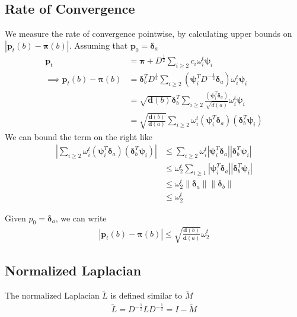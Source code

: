 \documentclass{math}
\renewcommand{\vec}[1]{\boldsymbol{#1}}
\begin{document}
\subsection{Rate of Convergence}

We measure the rate of convergence pointwise, by calculating upper bounds on $|\vec{p}_t(b) - \vec{\pi}(b)|$.
Assuming that $\vec{p}_0 = \vec{\delta}_a$
\begin{align*}
    \vec{p}_t &= \vec{\pi} + D^{\frac{1}{2}} \sum_{i \geq 2} c_i \omega_i^t \vec{\psi}_i \\
    \implies \vec{p}_t(b) - \vec{\pi}(b) &= \vec{\delta}_b^T D^{\frac{1}{2}} \sum_{i \geq 2}\left(\vec{\psi}_i^T D^{-\frac{1}{2}} \vec{\delta}_a\right) \omega_i^t \vec{\psi}_i \\
    &= \sqrt{\vec{d}(b)} \vec{\delta}_b^T \sum_{i \geq 2}\frac{(\vec{\psi}_i^T \vec{\delta}_a)}{\sqrt{d(a)}} \omega_i^t \vec{\psi}_i \\
    &= \sqrt{\frac{\vec{d}(b)}{\vec{d}(a)}} \sum_{i \geq 2}\omega_i^t(\vec{\psi}_i^T \vec{\delta}_a) (\vec{\delta}_b^T \vec{\psi}_i)
\end{align*}
We can bound the term on the right like
\begin{align*}
    \left| \sum_{i \geq 2}\omega_i^t(\vec{\psi}_i^T \vec{\delta}_a) (\vec{\delta}_b^T \vec{\psi}_i) \right| &\leq \sum_{i \geq 2} \omega_i^t |\vec{\psi}_i^T \vec{\delta}_a| |\vec{\delta}_b^T \vec{\psi}_i| \\
    &\leq \omega_2^t \sum_{i \geq 1} |\vec{\psi}_i^T \vec{\delta}_a| |\vec{\delta}_b^T \vec{\psi}_i| \\
    &\leq \omega_2^t \lVert \vec{\delta}_a \rVert \lVert \vec{\delta}_b \rVert \\
    &\leq \omega_2^t
\end{align*}

\begin{theorem}
    Given $p_0 = \vec{\delta}_a$, we can write
    \begin{align*}
        |\vec{p}_t(b) - \vec{\pi}(b)| \leq \sqrt{\frac{\vec{d}(b)}{\vec{d}(a)}} \omega_2^t
    \end{align*}
\end{theorem}

\subsection{Normalized Laplacian}

The normalized Laplacian $\widetilde{L}$ is defined similar to $\widetilde{M}$
\begin{align*}
    \widetilde{L} = D^{-\frac{1}{2}} L D^{-\frac{1}{2}} = I - \widetilde{M}
\end{align*}
\end{document}
